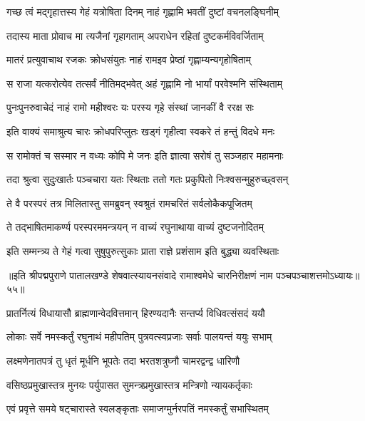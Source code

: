 \twolineshloka
{गच्छ त्वं मद्गृहात्तस्य गेहं यत्रोषिता दिनम्}
{नाहं गृह्णामि भवतीं दुष्टां वचनलङ्घिनीम्}%

\twolineshloka
{तदास्य माता प्रोवाच मा त्यजैनां गृहागताम्}
{अपराधेन रहितां दुष्टकर्मविवर्जिताम्}%

\twolineshloka
{मातरं प्रत्युवाचाथ रजकः क्रोधसंयुतः}
{नाहं रामइव प्रेष्ठां गृह्णाम्यन्यगृहोषिताम्}%

\twolineshloka
{स राजा यत्करोत्येव तत्सर्वं नीतिमद्भवेत्}
{अहं गृह्णामि नो भार्यां परवेश्मनि संस्थिताम्}%

\twolineshloka
{पुनःपुनरुवाचेदं नाहं रामो महीश्वरः}
{यः परस्य गृहे संस्थां जानकीं वै ररक्ष सः}%

\twolineshloka
{इति वाक्यं समाश्रुत्य चारः क्रोधपरिप्लुतः}
{खड्गं गृहीत्वा स्वकरे तं हन्तुं विदधे मनः}%

\twolineshloka
{स रामोक्तं च सस्मार न वध्यः कोपि मे जनः}
{इति ज्ञात्वा सरोषं तु सञ्जहार महामनाः}%

\twolineshloka
{तदा श्रुत्वा सुदुःखार्तः पञ्चचारा यतः स्थिताः}
{ततो गतः प्रकुपितो निःश्वसन्मुहुरुच्छ्वसन्}%

\twolineshloka
{ते वै परस्परं तत्र मिलितास्तु समब्रुवन्}
{स्वश्रुतं रामचरितं सर्वलोकैकपूजितम्}%

\twolineshloka
{ते तद्भाषितमाकर्ण्य परस्परममन्त्रयन्}
{न वाच्यं रघुनाथाया वाच्यं दुष्टजनोदितम्}%

\twolineshloka
{इति सम्मन्त्र्य ते गेहं गत्वा सुषुपुरुत्सुकाः}
{प्राता राज्ञे प्रशंसाम इति बुद्ध्या व्यवस्थिताः}%

{॥इति श्रीपद्मपुराणे पातालखण्डे शेषवात्स्यायनसंवादे रामाश्वमेधे चारनिरीक्षणं नाम पञ्चपञ्चाशत्तमोऽध्यायः॥५५॥}



\twolineshloka
{प्रातर्नित्यं विधायासौ ब्राह्मणान्वेदवित्तमान्}
{हिरण्यदानैः सन्तर्प्य विधिवत्संसदं ययौ}%

\twolineshloka
{लोकाः सर्वे नमस्कर्तुं रघुनाथं महीपतिम्}
{पुत्रवत्स्वप्रजाः सर्वाः पालयन्तं ययुः सभाम्}%

\twolineshloka
{लक्ष्मणेनातपत्रं तु धृतं मूर्धनि भूपतेः}
{तदा भरतशत्रुघ्नौ चामरद्वन्द्व धारिणौ}%

\twolineshloka
{वसिष्ठप्रमुखास्तत्र मुनयः पर्युपासत}
{सुमन्त्रप्रमुखास्तत्र मन्त्रिणो न्यायकर्तृकाः}%

\twolineshloka
{एवं प्रवृत्ते समये षट्चारास्ते स्वलङ्कृताः}
{समाजग्मुर्नरपतिं नमस्कर्तुं सभास्थितम्}%


